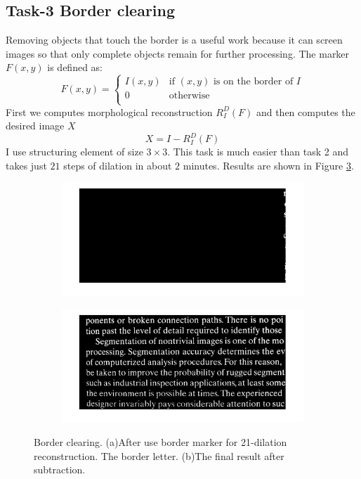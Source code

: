 \subsection{Task-3 Border clearing}
Removing objects that touch the border is a useful work because it can screen images so that only complete objects remain for further processing. The marker $F(x,y)$ is defined as:
\begin{equation}  
F(x, y)=\left\{
\begin{array}{rcl}
I(x,y) & \text{if $(x,y)$ is on the border of $I$} \\
0 & \text{otherwise} \\
\end{array} \right.
\end{equation}
First we computes morphological reconstruction $R_I^D(F)$ and then computes the desired image $X$
\begin{equation} X=I-R_I^D(F) \end{equation}
I use structuring element of size $3 \times 3$. This task is much easier than task 2 and takes just $21$ steps of dilation in about $2$ minutes. Results are shown in Figure \ref{fig:0932}.
\begin{figure}[h!]
	\centering
  	\begin{subfigure}[b]{0.45\linewidth}
		\includegraphics[width=\linewidth]{myfigure/p8/fig0932(a).png}
		\caption{}
		\label{fig:0932a}
	\end{subfigure}
	\begin{subfigure}[b]{0.45\linewidth}
    	\includegraphics[width=\linewidth]{myfigure/p8/fig0932(b).png}
    	\caption{}
    	\label{fig:0932b}
  	\end{subfigure}
  	\caption{Border clearing. (a)After use border marker for 21-dilation reconstruction. The border letter. (b)The final result after subtraction.}
  	\label{fig:0932}
\end{figure}

